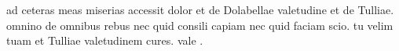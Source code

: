 


ad ceteras meas miserias accessit dolor et de Dolabellae valetudine et de Tulliae. omnino de omnibus rebus nec quid consili capiam nec quid faciam scio. tu velim tuam et Tulliae valetudinem cures. vale .
